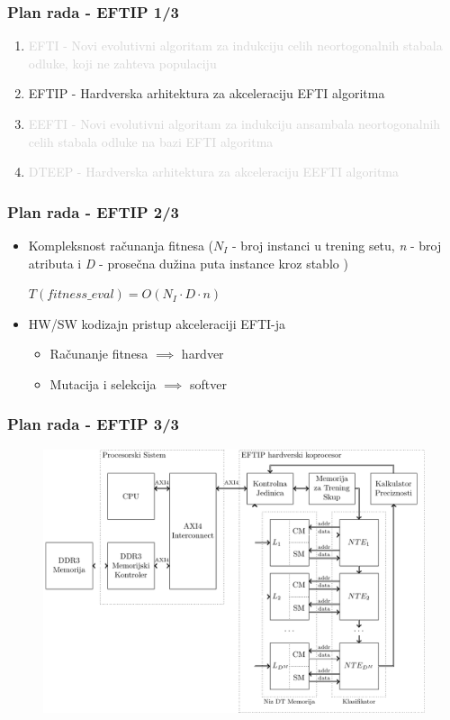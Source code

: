 \documentclass{beamer}
\newcommand{\light}[1]{\textcolor{lightgray}{#1}}
\begin{document}
\begin{frame}
\frametitle{Plan rada - EFTIP 1/3}
\begin{enumerate}
\setlength{\itemsep}{\fill}
\item\light{EFTI - Novi evolutivni algoritam za indukciju celih neortogonalnih stabala
odluke, koji ne zahteva populaciju}
\item EFTIP - Hardverska arhitektura za akceleraciju EFTI algoritma
\item\light{EEFTI - Novi evolutivni algoritam za indukciju ansambala neortogonalnih celih
stabala odluke na bazi EFTI algoritma}
\item\light{DTEEP - Hardverska arhitektura za akceleraciju EEFTI algoritma}
\end{enumerate}
\end{frame}


\begin{frame}
\frametitle{Plan rada - EFTIP 2/3}
\begin{itemize}
\setlength{\itemsep}{\fill}
\item Kompleksnost računanja fitnesa (\(N_{I}\) - broj instanci u trening setu, \emph{n} -
broj atributa i \emph{D} - prosečna dužina puta instance kroz stablo )\\
\vspace{1em}
\centerline{$T(fitness\_eval) = O(N_{I}\cdot D\cdot n)$}
\item HW/SW kodizajn pristup akceleraciji EFTI-ja
\begin{itemize}
\item Računanje fitnesa $\implies$ hardver
\item Mutacija i selekcija $\implies$ softver
\end{itemize}
\end{itemize}
\end{frame}


\begin{frame}[fragile]
\frametitle{Plan rada - EFTIP 3/3}
\begin{figure}
\includegraphics[width=0.9\linewidth]{eftip_architecture.pdf}
\end{figure}
\end{frame}
\end{document}
